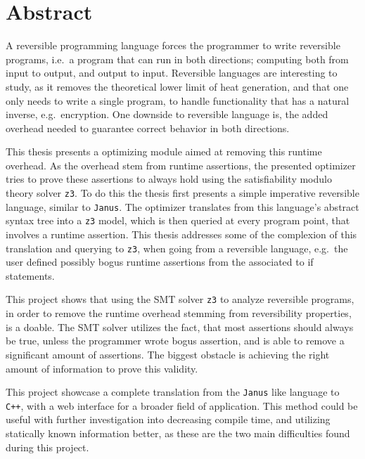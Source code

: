 \section*{Abstract}
A reversible programming language forces the programmer to write reversible programs, i.e.\
a program that can run in both directions; computing both from input to output, and output to
input. Reversible languages are interesting to study, as it removes the theoretical lower limit
of heat generation, and that one only needs to write a single program, to handle functionality
that has a natural inverse, e.g.\ encryption. One downside to reversible language is, the added
overhead needed to guarantee correct behavior in both directions.

This thesis presents a optimizing module aimed at removing this runtime overhead. As the overhead
stem from runtime assertions, the presented optimizer tries to prove these assertions to always
hold using the satisfiability modulo  theory solver \texttt{z3}. To do this the thesis first
presents a simple imperative reversible language, similar to \texttt{Janus}. The optimizer
translates from this language's abstract syntax tree into a \texttt{z3} model, which is then
queried at every program point, that involves a runtime assertion. This thesis addresses some
of the complexion of this translation and querying to \texttt{z3}, when going from a reversible
language, e.g.\ the user defined possibly bogus runtime assertions from the \lsin{fi} associated
to if statements.

This project shows that using the SMT solver \texttt{z3} to analyze reversible programs, in order
to remove the runtime overhead stemming from reversibility properties, is a doable. The SMT solver
utilizes the fact, that most assertions should always be true, unless the programmer wrote bogus
assertion, and is able to remove a significant amount of assertions. The biggest obstacle is
achieving the right amount of information to prove this validity.

This project showcase a complete translation from the \texttt{Janus} like language \lan to
\texttt{C++}, with a web interface for a broader field of application. This method could be useful
with further investigation into decreasing compile time, and utilizing statically known information
better, as these are the two main difficulties found during this project.